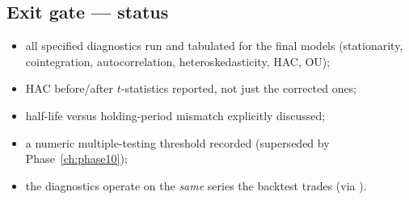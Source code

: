 \subsection{Exit gate --- status}

\begin{itemize}
  \item[\checkmark] all specified diagnostics run and tabulated for the final models
    (stationarity, cointegration, autocorrelation, heteroskedasticity, HAC, OU);
  \item[\checkmark] HAC before/after $t$-statistics reported, not just the corrected ones;
  \item[\checkmark] half-life versus holding-period mismatch explicitly discussed;
  \item[\checkmark] a numeric multiple-testing threshold recorded (superseded by
    Phase~\ref{ch:phase10});
  \item[\checkmark] the diagnostics operate on the \emph{same} series the backtest trades
    (via ).
\end{itemize}

